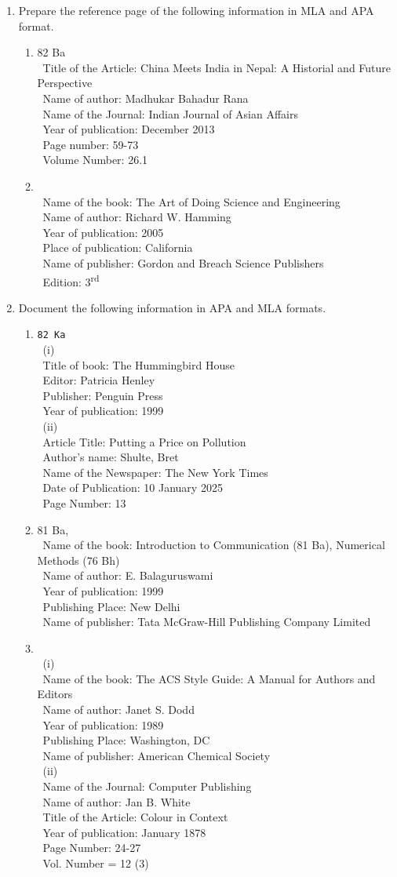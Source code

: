 \documentclass[12pt]{article}
\newcommand{\enter}{\\\textcolor{white}{1}}
\newcommand{\super}[1]{\textsuperscript{#1}}
\begin{document}
  \begin{enumerate}
    \item Prepare the reference page of the following information in MLA and APA format. \hfill 
      \begin{enumerate}
        \item 82 Ba
          \enter Title of the Article: China Meets India in Nepal: A Historial and Future Perspective
          \enter Name of author: Madhukar Bahadur Rana
          \enter Name of the Journal: Indian Journal of Asian Affairs
          \enter Year of publication: December 2013
          \enter Page number: 59-73
          \enter Volume Number: 26.1

        \item {}
          \enter Name of the book: The Art of Doing Science and Engineering
          \enter Name of author: Richard W. Hamming
          \enter Year of publication: 2005
          \enter Place of publication: California
          \enter Name of publisher: Gordon and Breach Science Publishers
          \enter Edition: 3\super{rd}
      \end{enumerate}

    \item Document the following information in APA and MLA formats.
      \begin{enumerate}
        \item \texttt{82 Ka}
          \enter (i)
          \enter Title of book: The Hummingbird House
          \enter Editor: Patricia Henley
          \enter Publisher: Penguin Press
          \enter Year of publication: 1999
          \enter (ii)
          \enter Article Title: Putting a Price on Pollution
          \enter Author's name: Shulte, Bret
          \enter Name of the Newspaper: The New York Times
          \enter Date of Publication: 10 January 2025
          \enter Page Number: 13

        \item 81 Ba, 
          \enter Name of the book: Introduction to Communication (81 Ba), Numerical Methods (76 Bh)
          \enter Name of author: E. Balaguruswami
          \enter Year of publication: 1999
          \enter Publishing Place: New Delhi
          \enter Name of publisher: Tata McGraw-Hill Publishing Company Limited
          

        \item {}
          \enter (i)
            \enter Name of the book: The ACS Style Guide: A Manual for Authors and Editors
            \enter Name of author: Janet S. Dodd
            \enter Year of publication: 1989
            \enter Publishing Place: Washington, DC
            \enter Name of publisher: American Chemical Society
            \enter (ii)
            \enter Name of the Journal: Computer Publishing
            \enter Name of author: Jan B. White
            \enter Title of the Article: Colour in Context
            \enter Year of publication: January 1878
            \enter Page Number: 24-27
            \enter Vol. Number = 12 (3)


\end{enumerate}
\end{enumerate}
\end{document}
